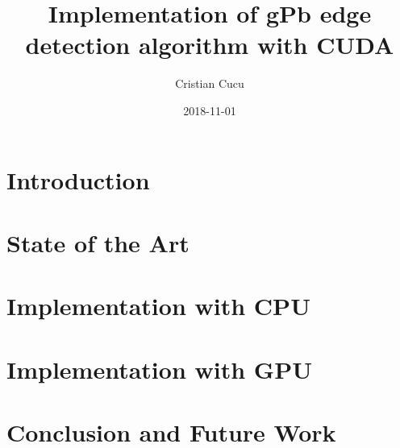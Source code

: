 \documentclass{article}
\title{Implementation of gPb edge detection algorithm with CUDA}
\date{2018-11-01}
\author{Cristian Cucu}
\begin{document}
\maketitle
\newpage
\lstset{language=C++}
\tableofcontents{}
\newpage

\section{Introduction}
\section{State of the Art}
\section{Implementation with CPU}
\section{Implementation with GPU}
\section{Conclusion and Future Work}
\end{document}
